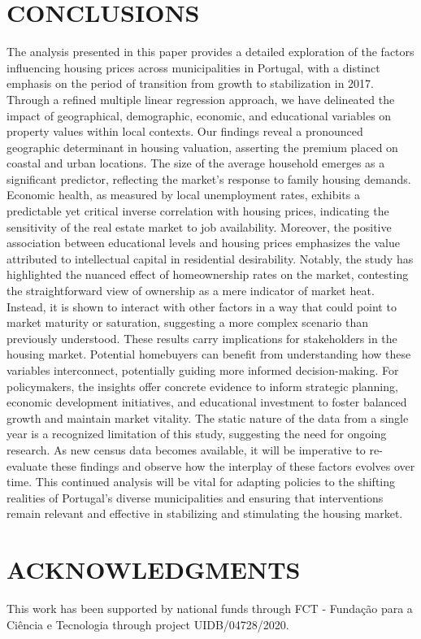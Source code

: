 \documentclass{aip-cp}
\begin{document}
\section{\uppercase{Conclusions}}

The analysis presented in this paper provides a detailed exploration of the factors influencing housing prices across municipalities in Portugal, with a distinct emphasis on the period of transition from growth to stabilization in 2017. Through a refined multiple linear regression approach, we have delineated the impact of geographical, demographic, economic, and educational variables on property values within local contexts.
Our findings reveal a pronounced geographic determinant in housing valuation, asserting the premium placed on coastal and urban locations. The size of the average household emerges as a significant predictor, reflecting the market's response to family housing demands. Economic health, as measured by local unemployment rates, exhibits a predictable yet critical inverse correlation with housing prices, indicating the sensitivity of the real estate market to job availability. Moreover, the positive association between educational levels and housing prices emphasizes the value attributed to intellectual capital in residential desirability.
Notably, the study has highlighted the nuanced effect of homeownership rates on the market, contesting the straightforward view of ownership as a mere indicator of market heat. Instead, it is shown to interact with other factors in a way that could point to market maturity or saturation, suggesting a more complex scenario than previously understood.
These results carry implications for stakeholders in the housing market. Potential homebuyers can benefit from understanding how these variables interconnect, potentially guiding more informed decision-making. For policymakers, the insights offer concrete evidence to inform strategic planning, economic development initiatives, and educational investment to foster balanced growth and maintain market vitality.
The static nature of the data from a single year is a recognized limitation of this study, suggesting the need for ongoing research. As new census data becomes available, it will be imperative to re-evaluate these findings and observe how the interplay of these factors evolves over time. This continued analysis will be vital for adapting policies to the shifting realities of Portugal's diverse municipalities and ensuring that interventions remain relevant and effective in stabilizing and stimulating the housing market.


\section{ACKNOWLEDGMENTS}
This work has been supported by national funds through FCT - Fundação para a Ciência e Tecnologia through project UIDB/04728/2020.


\nocite{*}
%
%
\end{document}
